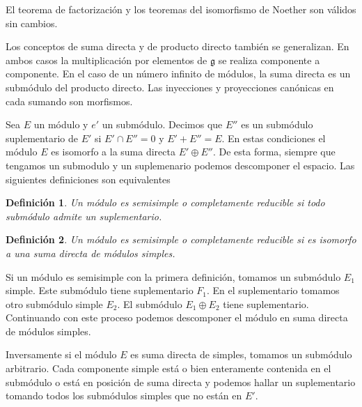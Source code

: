 \documentclass[a4paper,draft,12pt]{article}
\newtheorem{defi}{Definición}[section]%
\newcommand{\g}{\mathfrak{g}}%
\newcommand{\df}[1]{\textsf{\color{blue}#1}}
\begin{document}
El teorema de factorización y los teoremas del isomorfismo de Noether son válidos sin cambios.

\bigskip

Los conceptos de suma directa y de producto directo también se generalizan.  En ambos casos la multiplicación por elementos de $\g$ se realiza componente a componente.  En el caso de un número infinito de módulos, la suma directa es un submódulo del producto directo.  Las inyecciones y proyecciones canónicas en cada sumando son morfismos.

\bigskip

Sea $E$ un módulo y $e'$ un submódulo.  Decimos que $E''$ es un submódulo  \df{suplementario} de $E'$ si $E' \cap E''=0$ y $E'+E''= E$.  En estas condiciones el módulo $E$ es isomorfo a la suma directa $E' \oplus E''$.  De esta forma, siempre que tengamos un submodulo y un suplemenario podemos descomponer el espacio.  Las siguientes definiciones son equivalentes

\begin{defi}

Un módulo es  \df{semisimple}  o  \df{completamente reducible} si todo submódulo admite un suplementario.

\end{defi}

\begin{defi}

Un módulo es  \df{semisimple}  o  \df{completamente reducible} si es isomorfo a una suma directa de módulos simples.

\end{defi}

Si un módulo es semisimple con la primera definición, tomamos un submódulo $E_1$ simple.  Este submódulo tiene suplementario $F_1$. En el suplementario tomamos otro submódulo simple $E_2$.  El submódulo $E_1\oplus E_2$ tiene suplementario.  Continuando con este proceso podemos descomponer el módulo en suma directa de módulos simples.

Inversamente si el módulo $E$ es suma directa de simples, tomamos un submó\-dulo arbitrario.  Cada componente simple está o bien enteramente contenida en el submódulo o está en posición de suma directa y podemos hallar un suplementario tomando todos los submódulos simples que no están en $E'$.

\bigskip
\end{document}
